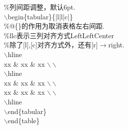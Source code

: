 \documentclass[11pt]{article}
\begin{document}
\begin{itemize}
\begin{multicols}{2}
{\begin{minipage}{7cm}
    				{\small \hspace*{2em}\%列间距调整，默认6pt.}\\
    				\hspace*{2em}$\backslash$begin\{tabular\}\{\fbox{@\{\}}|l|l|c|\}\\
    				{\small \hspace*{2em}\%@\{\}的作用为取消表格左右间距.}\\
    				{\small \hspace*{2em}\%llc表示三列对齐方式LeftLeftCenter}\\
    				{\small \hspace*{2em}\%除了[l],[c]对齐方式外，还有[r]$\to$right.}\\
    				\hspace*{4em}$\backslash$hline\\
    				\hspace*{6em}xx \& xx \& xx $\backslash\backslash$\\
    				\hspace*{4em}$\backslash$hline\\
    				\hspace*{6em}xx \& xx \& xx $\backslash\backslash$\\
    				\hspace*{6em}xx \& xx \& xx $\backslash\backslash$\\
    				\hspace*{4em}$\backslash$hline\\
    				\hspace*{2em}$\backslash$end\{tabular\}\\
    				$\backslash$end\{table\}
    		\end{minipage}}
    	\end{multicols}
    \end{itemize}
\end{document}

